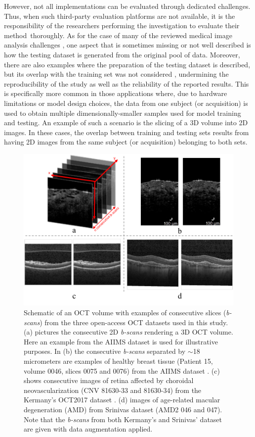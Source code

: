 \documentclass[fleqn,10pt]{wlscirep}
\begin{document}
However, not all implementations can be evaluated through dedicated challenges. Thus, when such third-party evaluation platforms are not available, it is the responsibility of the researchers performing the investigation to evaluate their \mbox{method thoroughly}. As for the case of many of the reviewed medical image analysis challenges \cite{maier2018rankings}, one aspect that is sometimes missing or not well described is how the testing dataset is generated from the original pool of data. Moreover, there are also examples where the preparation of the testing dataset is described, but its overlap with the training set was not considered \cite{wang2019deep, butola2020deep, irmak2021multi, sadad2021brain, yagis2021effect}, undermining the reproducibility of the study as well as the reliability of the reported results. This is specifically more common in those applications where, due to hardware limitations or model design choices, the data from one subject (or acquisition) is used to obtain multiple dimensionally-smaller samples used for model training and testing. An example of such a scenario is the slicing of a 3D volume into 2D images. In these cases, the overlap between training and testing sets results from having 2D images from the same subject (or acquisition) belonging to both sets.
\begin{figure}[t]
\centering
\includegraphics[width=420pt]{OCT_inflation_intro_dataset_v1.pdf}
\caption{Schematic of an OCT volume with examples of consecutive slices (\textit{b-scans}) from the three open-access OCT datasets used in this study. (a) pictures the consecutive 2D \textit{b-scans} rendering a 3D OCT volume. Here an example from the AIIMS dataset \cite{butola2019volumetric} is used for illustrative purposes. In (b) the consecutive \textit{b-scans} separated by $\sim$18 micrometers are examples of healthy breast tissue (Patient 15, volume 0046, slices 0075 and 0076) from the AIIMS dataset \cite{butola2019volumetric}. (c) shows consecutive images of retina affected by choroidal neovascularization (CNV 81630-33 and 81630-34) from the Kermany’s OCT2017 dataset \cite{kermany2018large}.  (d) images of age-related macular degeneration (AMD) from Srinivas dataset (AMD2 046 and 047).
Note that the \textit{b-scans} from both Kermany’s and Srinivas' dataset are given with data augmentation applied.}
\label{fig:introduction_1}
\end{figure}
\end{document}
